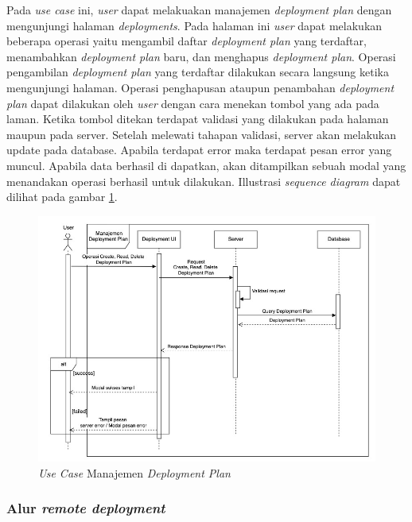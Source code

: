 Pada \textit{use case} ini, \textit{user} dapat melakuakan manajemen \textit{deployment plan} dengan mengunjungi halaman \textit{deployments}. Pada halaman ini \textit{user} dapat melakukan beberapa operasi yaitu mengambil daftar \textit{deployment plan} yang terdaftar, menambahkan \textit{deployment plan} baru, dan menghapus \textit{deployment plan}. Operasi pengambilan \textit{deployment plan} yang terdaftar dilakukan secara langsung ketika mengunjungi halaman. Operasi penghapusan ataupun penambahan \textit{deployment plan} dapat dilakukan oleh \textit{user} dengan cara menekan tombol yang ada pada laman. Ketika tombol ditekan terdapat validasi yang dilakukan pada halaman maupun pada server. Setelah melewati tahapan validasi, server akan melakukan update pada database. Apabila terdapat error maka terdapat pesan error yang muncul. Apabila data berhasil di dapatkan, akan ditampilkan sebuah modal yang menandakan operasi berhasil untuk dilakukan. Illustrasi \textit{sequence diagram} dapat dilihat pada gambar \ref{fig:usecase-11}.


\begin{figure}[ht]
  \centering
  \includegraphics[width=1\textwidth]{resources/chapter-3/usecase/uc-11.jpg}
  \caption{\textit{Use Case} Manajemen \textit{Deployment Plan}}
  \label{fig:usecase-11}
\end{figure}

\pagebreak

\subsubsection{Alur \textit{remote deployment}}

